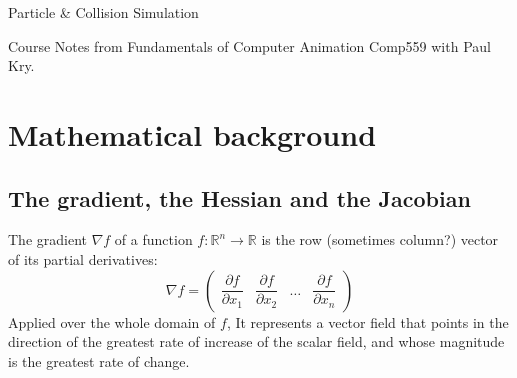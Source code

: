 \documentclass{article}
\begin{document}
\centerline{\sc \large Particle \& Collision Simulation}
\centerline{Course Notes from Fundamentals of Computer Animation Comp559 with Paul Kry.}

\section{Mathematical background}
\subsection{The gradient, the Hessian and the Jacobian}
The gradient $\nabla f$ of  a function $ f: \mathbb{R}^n \longrightarrow \mathbb{R} $
is the row (sometimes column?) vector of its partial derivatives:
\[
    \nabla f =
    \begin{pmatrix}
        \dfrac{\partial f}{\partial x_1} &
        \dfrac{\partial f}{\partial x_2} &
        \hdots &
        \dfrac{\partial f}{\partial x_n}
    \end{pmatrix}
\]
Applied over the whole domain of $f$, It represents a vector field that points in the direction of the greatest rate of increase of the scalar field,
and whose magnitude is the greatest rate of change.
\end{document}
